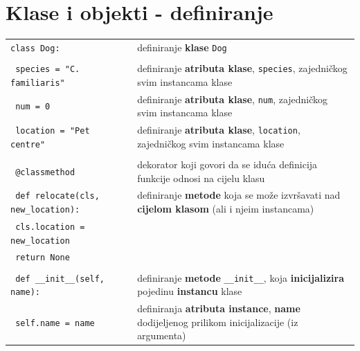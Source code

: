 \documentclass[10pt]{article}
\begin{document}
    \section*{\color{NavyBlue} Klase i objekti - definiranje}
    \begin{tabular}{|>{\tt}p{10.00cm}|>{}p{14.50cm}|}
        \hline
        class Dog: & definiranje \textbf{klase} \texttt{Dog}
        \\ & \\
        \hspace{5mm} species = "C. familiaris" & definiranje \textbf{atributa klase}, \texttt{species}, zajedničkog svim instancama klase
        \\
        \hspace{5mm} num = 0 & definiranje \textbf{atributa klase}, \texttt{num}, zajedničkog svim instancama klase
        \\
        \hspace{5mm} location = "Pet centre" & definiranje \textbf{atributa klase}, \texttt{location}, zajedničkog svim instancama klase
        \\ & \\
        \hspace{5mm} @classmethod & dekorator koji govori da se iduća definicija funkcije odnosi na cijelu klasu
        \\
        \hspace{5mm} def relocate(cls, new\_location): & definiranje \textbf{metode} koja se može izvršavati nad \textbf{cijelom klasom} (ali i njeim instancama)
        \\
        \hspace{5mm} \hspace{5mm} cls.location = new\_location &
        \\
        \hspace{5mm} \hspace{5mm} return None &
        \\ & \\
        \hspace{5mm} def \_\_init\_\_(self, name): & definiranje \textbf{metode} \texttt{\_\_init\_\_}, koja \textbf{inicijalizira} pojedinu \textbf{instancu} klase
        \\
        \hspace{5mm} \hspace{5mm} self.name = name & definiranja \textbf{atributa instance}, \textbf{name} dodijeljenog prilikom inicijalizacije (iz argumenta)
        \\

\end{tabular}
\end{document}
